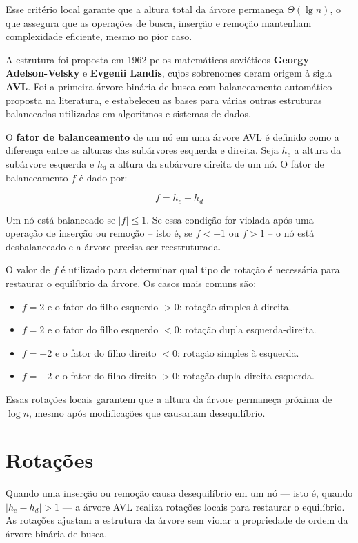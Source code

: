 Esse critério local garante que a altura total da árvore permaneça $\Theta(\lg n)$, o que assegura que as operações de busca, inserção e remoção mantenham complexidade eficiente, mesmo no pior caso.

A estrutura foi proposta em 1962 pelos matemáticos soviéticos \textbf{Georgy Adelson-Velsky} e \textbf{Evgenii Landis}, cujos sobrenomes deram origem à sigla \textbf{AVL}. 
Foi a primeira árvore binária de busca com balanceamento automático proposta na literatura, e estabeleceu as bases para várias outras estruturas balanceadas utilizadas em algoritmos e sistemas de dados.

O \textbf{fator de balanceamento} de um nó em uma árvore AVL é definido como a diferença entre as alturas das subárvores esquerda e direita. 
Seja $h_e$ a altura da subárvore esquerda e $h_d$ a altura da subárvore direita de um nó. 
O fator de balanceamento $f$ é dado por:

\[
f = h_e - h_d
\]

Um nó está balanceado se $|f| \leq 1$. 
Se essa condição for violada após uma operação de inserção ou remoção -- isto é, se $f < -1$ ou $f > 1$ -- o nó está desbalanceado e a árvore precisa ser reestruturada.

O valor de $f$ é utilizado para determinar qual tipo de rotação é necessária para restaurar o equilíbrio da árvore. 
Os casos mais comuns são:

\begin{itemize}
    \item $f = 2$ e o fator do filho esquerdo $> 0$: rotação simples à direita.
    \item $f = 2$ e o fator do filho esquerdo $< 0$: rotação dupla esquerda-direita.
    \item $f = -2$ e o fator do filho direito $< 0$: rotação simples à esquerda.
    \item $f = -2$ e o fator do filho direito $> 0$: rotação dupla direita-esquerda.
\end{itemize}

Essas rotações locais garantem que a altura da árvore permaneça próxima de $\log n$, mesmo após modificações que causariam desequilíbrio.


\section{Rotações}

Quando uma inserção ou remoção causa desequilíbrio em um nó — isto é, quando $|h_e - h_d| > 1$ — a árvore AVL realiza rotações locais para restaurar o equilíbrio. As rotações ajustam a estrutura da árvore sem violar a propriedade de ordem da árvore binária de busca.

